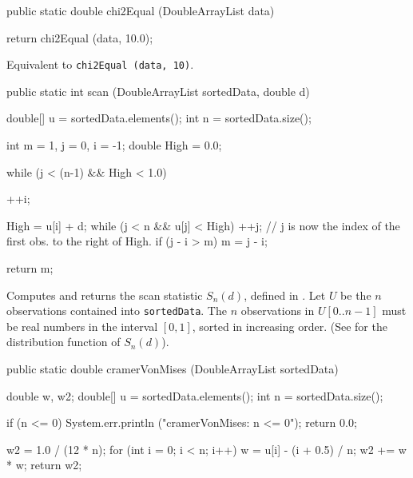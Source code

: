 \begin{code}

   public static double chi2Equal (DoubleArrayList data)\begin{hide} {
   return chi2Equal (data, 10.0);
}\end{hide}
\end{code}
\begin{tabb} Equivalent to \texttt{chi2Equal (data, 10)}.
\end{tabb}
\begin{htmlonly}
   \param{data}{array of observations in $[0,1)$}
\end{htmlonly}
\begin{code}

   public static int scan (DoubleArrayList sortedData, double d)\begin{hide} {

      double[] u = sortedData.elements();
      int n = sortedData.size();

      int m = 1, j = 0, i = -1;
      double High = 0.0;

      while (j < (n-1) && High < 1.0) {
         ++i;

         High = u[i] + d;
         while (j < n && u[j] < High)
            ++j;
         // j is now the index of the first obs. to the right of High.
         if (j - i > m)
            m = j - i;
      }
      return m;
   }\end{hide}
\end{code}
 \begin{tabb} Computes and returns the scan statistic $S_n (d)$,
  defined in \latex{(\ref{eq:scan})}.
  Let $U$ be the $n$ observations contained into \texttt{sortedData}.
  The $n$ observations in $U[0..n-1]$ must be real numbers
  in the interval $[0,1]$, sorted in increasing order.
  (See  for the distribution function of $S_n (d)$).
 \end{tabb}
\begin{htmlonly}
\end{htmlonly}
\begin{code}

   public static double cramerVonMises (DoubleArrayList sortedData)\begin{hide} {
      double w, w2;
      double[] u = sortedData.elements();
      int n = sortedData.size();

      if (n <= 0) {
         System.err.println ("cramerVonMises:  n <= 0");
         return 0.0;
      }

      w2 = 1.0 / (12 * n);
      for (int i = 0; i < n; i++) {
         w = u[i] - (i + 0.5) / n;
         w2 += w * w;
      }
      return w2;
   }\end{hide}
\end{code}
